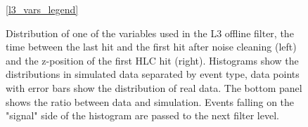%     
%     

\begin{figure}
    \centering
    \ref{l3_vars_legend}\par
    
    

    \caption{Distribution of one of the variables used in the L3 offline filter, the time between the last hit and the first hit after noise cleaning (left) and the z-position of the first HLC hit (right). Histograms show the distributions in simulated data separated by event type, data points with error bars show the distribution of real data. The bottom panel shows the ratio between data and simulation. Events falling on the "signal" side of the histogram are passed to the next filter level.}
    \label{fig:l3-cut-vars}
\end{figure}

